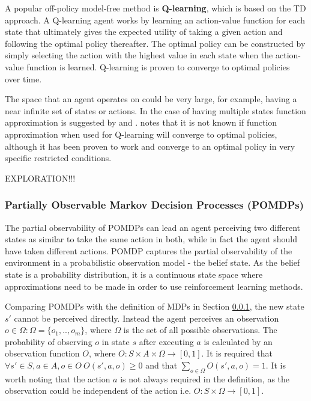 A popular off-policy model-free method is \textbf{Q-learning}, which is based
on the TD approach. A Q-learning agent works by learning an action-value
function for each state that ultimately gives the expected utility of taking a
given action and following the optimal policy thereafter. The optimal policy
can be constructed by simply selecting the action with the highest value in
each state when the action-value function is learned. Q-learning is proven to
converge to optimal policies over time. \parencite{Russell2010ai+modern}

The space that an agent operates on could be very large, for example, having a
near infinite set of states or actions. In the case of having multiple states
function approximation is suggested by \textcite{Sutton1998ai+reinforcement}
and \textcite{Russell2010ai+modern}. \textcite{Szepesvari2010ai+algorithms}
notes that it is not known if function approximation when used for Q-learning
will converge to optimal policies, although it has been proven to work and
converge to an optimal policy in very specific restricted conditions.

EXPLORATION!!!


\subsubsection{Partially Observable Markov Decision Processes (POMDPs)}
\label{sec:ai:pomdp}

The partial observability of POMDPs can lead an agent perceiving two different
states as similar to take the same action in both, while in fact the agent
should have taken different actions. POMDP captures the partial observability
of the environment in a probabilistic observation model - the belief state. As
the belief state is a probability distribution, it is a continuous state space
where approximations need to be made in order to use reinforcement learning
methods. \parencite{Russell2010ai+modern}

Comparing POMDPs with the definition of MDPs in Section \ref{sec:ai:pomdp}, the
new state \(s'\) cannot be perceived directly. Instead the agent perceives an
observation \(o \in \Omega : \Omega = \{o_1,..,o_m\}\), where \(\Omega\) is the
set of all possible observations. The probability of observing \(o\) in state
\(s\) after executing \(a\) is calculated by an observation function \(O\),
where \(O : S \times A \times \Omega \rightarrow [0,1] \). It is required that
\(\forall s' \in S, a \in A, o \in O ~ O (s', a, o) \geq 0 \) and that
\(\sum_{o \in \Omega}^{} O (s', a, o) = 1 \). It is worth noting that the
action \(a\) is not always required in the definition, as the observation could
be independent of the action i.e. \(O : S \times \Omega \rightarrow [0,1] \).
\parencite{Spaan2012ai+pomdp}

